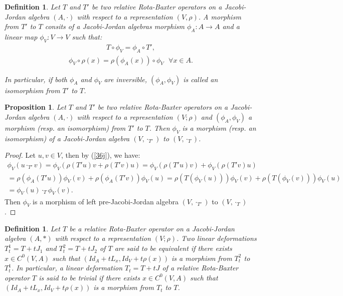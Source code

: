\documentclass[12pt]{amsart}
\newtheorem{definition}[Theorem]{Definition}
\newtheorem{proposition}[Theorem]{Proposition}
\begin{document}
	\begin{definition}\label{D9j}
		Let $ T $ and $ T' $ be two relative Rota-Baxter operators on a Jacobi-Jordan algebra $ (A,\cdot) $ with respect to a representation $ (V, \rho) $. A morphism from $ T' $ to $ T $ consits of a Jacobi-Jordan algebras morphism $\phi_{A} : A\to A $ and a linear map $ \phi_{V} : V\to V $ such that:
		\begin{eqnarray}
			\label{36j}
			T \circ \phi_{V}=\phi_{A}\circ T',
		\end{eqnarray}
		\begin{eqnarray}
			\label{37j}
			\phi_{V}\circ\rho(x)=\rho(\phi_{A}(x))\circ\phi_{V} \mbox{ $\forall x\in A $.}
		\end{eqnarray}
		
		In particular, if both $ \phi_A$ and $ \phi_{V}$ are inversible, $ (\phi_{A},\phi_{V}) $ is called an isomorphism from $ T' $ to $ T $.
	\end{definition}
	\begin{proposition}\label{Pro8j}
		Let $ T $ and $ T' $ be two relative Rota-Baxter operators on a Jacobi-Jordan algebra $ (A,\cdot) $ with respect to a representation $ (V; \rho) $ and $ (\phi_{A},\phi_{V}) $ a morphism (resp. an isomorphism) from $ T' $ to $ T $. Then $ \phi_{V} $ is a morphism (resp. an isomorphism) of a Jacobi-Jordan algebra $ (V,\cdot_{T'}) $ to $ (V,\cdot_{T})$.
	\end{proposition}
	\begin{proof}
		Let $ u,v\in V $, then by (\ref{36j}),  we have:\\
		$ \begin{array}{lll}
			\phi_{V} (u\cdot_{T'} v)=\phi_{V}(\rho(T'u)v+\rho(T'v)u)=\phi_{V}(\rho(T'u)v)+\phi_{V}(\rho(T'v)u)\\
			=\rho(\phi_A(T'u))\phi_{V}(v)+\rho(\phi_A(T'v))\phi_{V}(u)=\rho(T(\phi_{V}(u)))\phi_{V}(v)+\rho(T(\phi_{V}(v)))\phi_{V}(u)\\
			=\phi_{V}(u)\cdot_{T}\phi_{V}(v).
		\end{array} $\\
		Then $ \phi_{V} $ is a morphism of left pre-Jacobi-Jordan algebra $ (V,\cdot_{T'}) $ to $ (V,\cdot_{T}) $ .
	\end{proof}
	\begin{definition}\label{D12j}
		Let $ T $ be a relative Rota-Baxter operator on a Jacobi-Jordan algebra $ (A,\ast) $ with respect to a representation $(V;\rho) $. Two linear deformations $ T^{1}_{t}=T+tJ_{1} $ and $ T^{2}_{t}=T+tJ_{2} $ of $T$ are said to be equivalent if there exists $ x\in C^0(V,A) $ such that $ (Id_{A}+tL_{x},Id_{V}+t\rho(x)) $ is a morphism from $ T_{t}^{2} $ to $ T_{t}^{1} $. In particular, a linear deformation $ T_{t}=T+tJ $ of a relative Rota-Baxter operator $ T $ is said to be trivial if there exists $ x\in C^0(V,A) $ such that $ (Id_{A}+tL_{x},Id_{V}+t\rho(x)) $ is a morphism from $ T_{t} $ to $ T $.  	
	\end{definition}
\end{document}
